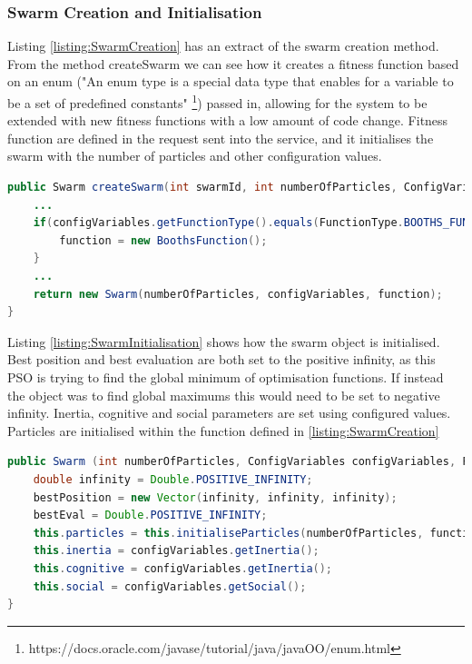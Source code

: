 \documentclass[oneside,12pt]{book}
\begin{document}
\subsubsection{Swarm Creation and Initialisation}
Listing \ref{listing:SwarmCreation} has an extract of the swarm creation method. From the method createSwarm we can see how it creates a fitness function based on an enum ("An enum type is a special data type that enables for a variable to be a set of predefined constants" \footnote{https://docs.oracle.com/javase/tutorial/java/javaOO/enum.html}) passed in, allowing for the system to be extended with new fitness functions with a low amount of code change. Fitness function are defined in the request sent into the service, and it initialises the swarm with the number of particles and other configuration values.

\begin{lstlisting}[basicstyle=\footnotesize, language=Java]
public Swarm createSwarm(int swarmId, int numberOfParticles, ConfigVariables configVariables) throws Exception {
    ...
    if(configVariables.getFunctionType().equals(FunctionType.BOOTHS_FUNCTION)){
        function = new BoothsFunction();
    } 
    ...
    return new Swarm(numberOfParticles, configVariables, function);
}
\end{lstlisting}
\label{listing:SwarmCreation}

Listing \ref{listing:SwarmInitialisation} shows how the swarm object is initialised. Best position and best evaluation are both set to the positive infinity, as this PSO is trying to find the global minimum of optimisation functions. If instead the object was to find global maximums this would need to be set to negative infinity. Inertia, cognitive and social parameters are set using configured values. Particles are initialised within the function defined in \ref{listing:SwarmCreation}

\begin{lstlisting}[basicstyle=\footnotesize, language=Java]
public Swarm (int numberOfParticles, ConfigVariables configVariables, Function function) {
    double infinity = Double.POSITIVE_INFINITY;
    bestPosition = new Vector(infinity, infinity, infinity);
    bestEval = Double.POSITIVE_INFINITY;
    this.particles = this.initialiseParticles(numberOfParticles, function);
    this.inertia = configVariables.getInertia();
    this.cognitive = configVariables.getInertia();
    this.social = configVariables.getSocial();
}
\end{lstlisting}
\label{listing:SwarmInitialisation}
\end{document}
